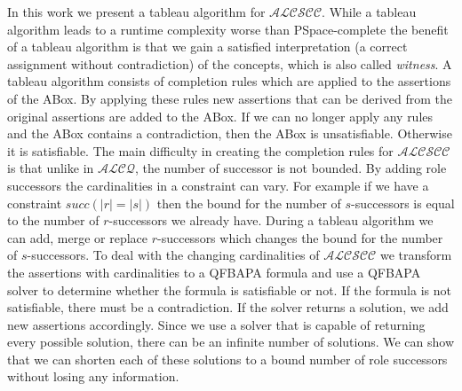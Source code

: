 \documentclass{book}
\theoremstyle{break}
\theoremstyle{definition}
\begin{document}
In this work we present a tableau algorithm for $\mathcal{ALCSCC}$. While a tableau algorithm leads to a runtime complexity worse than PSpace-complete the benefit of a tableau algorithm is that we gain a satisfied interpretation (a correct assignment without contradiction) of the concepts, which is also called \textit{witness}. A tableau algorithm consists of completion rules which are applied to the assertions of the ABox. By applying these rules new assertions that can be derived from the original assertions are added to the ABox. If we can no longer apply any rules and the ABox contains a contradiction, then the ABox is unsatisfiable. Otherwise it is satisfiable. The main difficulty in creating the completion rules for $\mathcal{ALCSCC}$ is that unlike in $\mathcal{ALCQ}$, the number of successor is not bounded. By adding role successors the cardinalities in a constraint can vary. For example if we have a constraint $succ(|r|=|s|)$ then the bound for the number of $s$-successors is equal to the number of $r$-successors we already have. During a tableau algorithm we can add, merge or replace $r$-successors which changes the bound for the number of $s$-successors. To deal with the changing cardinalities of $\mathcal{ALCSCC}$ we transform the assertions with cardinalities to a QFBAPA formula and use a QFBAPA solver to determine whether the formula is satisfiable or not. If the formula is not satisfiable, there must be a contradiction. If the solver returns a solution, we add new assertions accordingly. Since we use a solver that is capable of returning every possible solution, there can be an infinite number of solutions. We can show that we can shorten each of these solutions to a bound number of role successors without losing any information.
\end{document}

